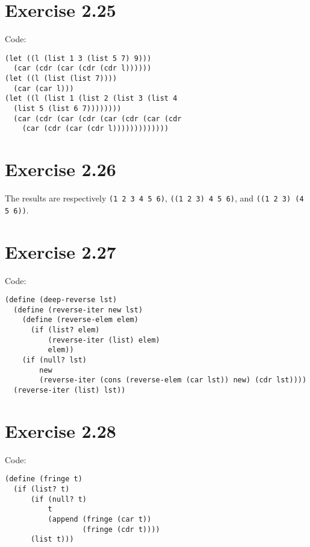 \documentclass[../main.tex]{subfiles}
\begin{document}

\section{Exercise 2.25}

Code:

\begin{lstlisting}
(let ((l (list 1 3 (list 5 7) 9)))
  (car (cdr (car (cdr (cdr l))))))
(let ((l (list (list 7))))
  (car (car l)))
(let ((l (list 1 (list 2 (list 3 (list 4
  (list 5 (list 6 7))))))))
  (car (cdr (car (cdr (car (cdr (car (cdr
    (car (cdr (car (cdr l)))))))))))))
\end{lstlisting}

\section{Exercise 2.26}

The results are respectively
\lstinline{(1 2 3 4 5 6)},
\lstinline{((1 2 3) 4 5 6)},
and \lstinline{((1 2 3) (4 5 6))}.

\section{Exercise 2.27}

Code:

\begin{lstlisting}
(define (deep-reverse lst)
  (define (reverse-iter new lst)
    (define (reverse-elem elem)
      (if (list? elem)
          (reverse-iter (list) elem)
          elem))
    (if (null? lst)
        new
        (reverse-iter (cons (reverse-elem (car lst)) new) (cdr lst))))
  (reverse-iter (list) lst))
\end{lstlisting}

\section{Exercise 2.28}

Code:

\begin{lstlisting}
(define (fringe t)
  (if (list? t)
      (if (null? t)
          t
          (append (fringe (car t))
                  (fringe (cdr t))))
      (list t)))
\end{lstlisting}
\end{document}
